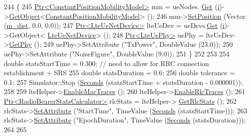 \begin{DoxyCode}
244     \{
245       \hyperlink{classns3_1_1Ptr}{Ptr<ConstantPositionMobilityModel>} mm = ueNodes.
      \hyperlink{classns3_1_1NodeContainer_a9ed96e2ecc22e0f5a3d4842eb9bf90bf}{Get} (\hyperlink{bernuolliDistribution_8m_a6f6ccfcf58b31cb6412107d9d5281426}{i})->\hyperlink{classns3_1_1Object_a13e18c00017096c8381eb651d5bd0783}{GetObject}<\hyperlink{classns3_1_1ConstantPositionMobilityModel}{ConstantPositionMobilityModel}> ();
246       mm->\hyperlink{classns3_1_1MobilityModel_ac584b3d5a309709d2f13ed6ada1e7640}{SetPosition} (Vector (\hyperlink{classLenaTtaFfMacSchedulerTestCase_a1017fe2567e0c80556ff9bbaa76176c5}{m\_dist}, 0.0, 0.0));
247       \hyperlink{classns3_1_1Ptr}{Ptr<LteUeNetDevice>} lteUeDev = ueDevs.\hyperlink{classns3_1_1NetDeviceContainer_a677d62594b5c9d2dea155cc5045f4d0b}{Get} (\hyperlink{bernuolliDistribution_8m_a6f6ccfcf58b31cb6412107d9d5281426}{i})->GetObject<
      \hyperlink{classns3_1_1LteUeNetDevice}{LteUeNetDevice}> ();
248       \hyperlink{classns3_1_1Ptr}{Ptr<LteUePhy>} uePhy = lteUeDev->\hyperlink{classns3_1_1LteUeNetDevice_a2a9940a1e457a8bf3dae87fed4199c7a}{GetPhy} ();
249       uePhy->SetAttribute (\textcolor{stringliteral}{"TxPower"}, DoubleValue (23.0));
250       uePhy->SetAttribute (\textcolor{stringliteral}{"NoiseFigure"}, DoubleValue (9.0));
251     \}
252 
253 
254   \textcolor{keywordtype}{double} statsStartTime = 0.300; \textcolor{comment}{// need to allow for RRC connection establishment + SRS}
255   \textcolor{keywordtype}{double} statsDuration = 0.6;
256   \textcolor{keywordtype}{double} tolerance = 0.1;
257   Simulator::Stop (\hyperlink{group__timecivil_ga33c34b816f8ff6628e33d5c8e9713b9e}{Seconds} (statsStartTime + statsDuration - 0.000001));
258 
259   lteHelper->\hyperlink{classns3_1_1LteHelper_affa3a12841520407d3662417fe41863d}{EnableMacTraces} ();
260   lteHelper->\hyperlink{classns3_1_1LteHelper_abadfdd04d30b261e9b6f0846b4784928}{EnableRlcTraces} ();
261   \hyperlink{classns3_1_1Ptr}{Ptr<RadioBearerStatsCalculator>} rlcStats = lteHelper->
      \hyperlink{classns3_1_1LteHelper_a6eb438ccf69642e3863adea4991fa2ca}{GetRlcStats} ();
262   rlcStats->\hyperlink{classns3_1_1ObjectBase_ac60245d3ea4123bbc9b1d391f1f6592f}{SetAttribute} (\textcolor{stringliteral}{"StartTime"}, TimeValue (\hyperlink{group__timecivil_ga33c34b816f8ff6628e33d5c8e9713b9e}{Seconds} (statsStartTime)));
263   rlcStats->\hyperlink{classns3_1_1ObjectBase_ac60245d3ea4123bbc9b1d391f1f6592f}{SetAttribute} (\textcolor{stringliteral}{"EpochDuration"}, TimeValue (\hyperlink{group__timecivil_ga33c34b816f8ff6628e33d5c8e9713b9e}{Seconds} (statsDuration)));
264 
265 

\end{DoxyCode}
